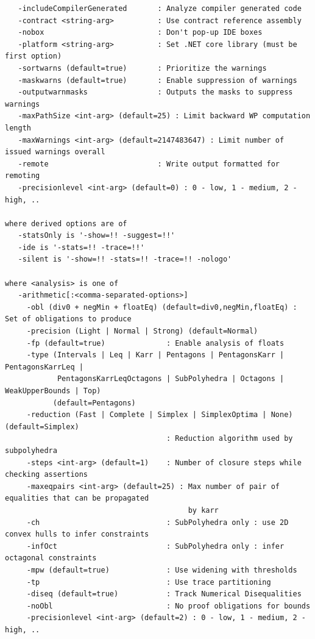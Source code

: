 \documentclass{article}
\begin{document}
{\begin{verbatim}
   -includeCompilerGenerated       : Analyze compiler generated code
   -contract <string-arg>          : Use contract reference assembly
   -nobox                          : Don't pop-up IDE boxes
   -platform <string-arg>          : Set .NET core library (must be first option)
   -sortwarns (default=true)       : Prioritize the warnings
   -maskwarns (default=true)       : Enable suppression of warnings
   -outputwarnmasks                : Outputs the masks to suppress warnings
   -maxPathSize <int-arg> (default=25) : Limit backward WP computation length
   -maxWarnings <int-arg> (default=2147483647) : Limit number of issued warnings overall
   -remote                         : Write output formatted for remoting
   -precisionlevel <int-arg> (default=0) : 0 - low, 1 - medium, 2 - high, ..

where derived options are of
   -statsOnly is '-show=!! -suggest=!!'
   -ide is '-stats=!! -trace=!!'
   -silent is '-show=!! -stats=!! -trace=!! -nologo'

where <analysis> is one of
   -arithmetic[:<comma-separated-options>]
     -obl (div0 + negMin + floatEq) (default=div0,negMin,floatEq) : Set of obligations to produce
     -precision (Light | Normal | Strong) (default=Normal)
     -fp (default=true)              : Enable analysis of floats
     -type (Intervals | Leq | Karr | Pentagons | PentagonsKarr | PentagonsKarrLeq |
            PentagonsKarrLeqOctagons | SubPolyhedra | Octagons | WeakUpperBounds | Top)
           (default=Pentagons)
     -reduction (Fast | Complete | Simplex | SimplexOptima | None) (default=Simplex)
                                     : Reduction algorithm used by subpolyhedra
     -steps <int-arg> (default=1)    : Number of closure steps while checking assertions
     -maxeqpairs <int-arg> (default=25) : Max number of pair of equalities that can be propagated 
                                          by karr
     -ch                             : SubPolyhedra only : use 2D convex hulls to infer constraints
     -infOct                         : SubPolyhedra only : infer octagonal constraints
     -mpw (default=true)             : Use widening with thresholds
     -tp                             : Use trace partitioning
     -diseq (default=true)           : Track Numerical Disequalities
     -noObl                          : No proof obligations for bounds
     -precisionlevel <int-arg> (default=2) : 0 - low, 1 - medium, 2 - high, ..


\end{verbatim}}
\end{document}
